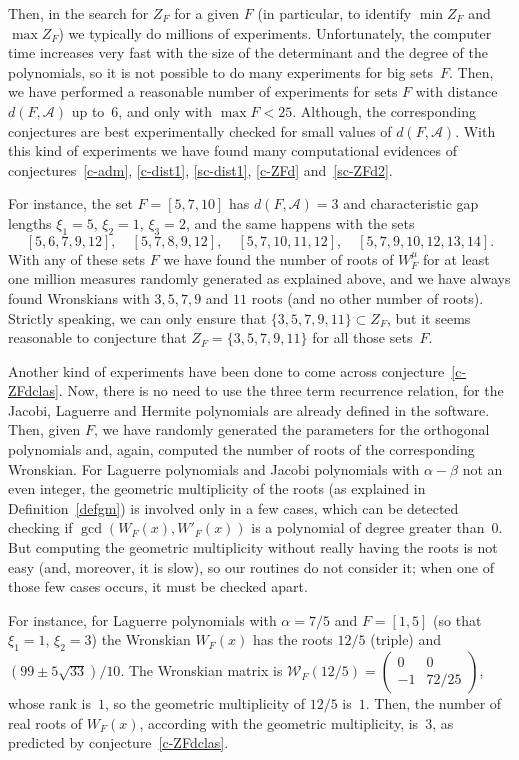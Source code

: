 \documentclass[10pt]{article}
\theoremstyle{plain}
\theoremstyle{definition}
\numberwithin{equation}{section} %
\newcommand\Ad{\mathcal{A}}
\newcommand\W{\mathcal{W}}
\begin{document}
Then, in the search for $Z_F$ for a given $F$ (in particular, to identify $\min Z_F$ and $\max Z_F$) we typically do millions of experiments. Unfortunately, the computer time increases very fast with the size of the determinant and the degree of the polynomials, so it is not possible to do many experiments for big sets~$F$. Then, we have performed a reasonable number of experiments for sets $F$ with distance $d(F,\Ad)$ up to~$6$, and only with $\max F < 25$. Although, the corresponding conjectures are best experimentally checked for small values of $d(F,\Ad)$. With this kind of experiments we have found many computational evidences of conjectures~\ref{c-adm}, \ref{c-dist1}, \ref{sc-dist1}, \ref{c-ZFd} and~\ref{sc-ZFd2}.

For instance, the set $F = [5,7,10]$ has $d(F,\Ad) = 3$ and characteristic gap lengths $\xi_1 = 5$, $\xi_2 = 1$, $\xi_3 = 2$, and the same happens with the sets
\[
[5,6,7,9,12], \quad
[5,7,8,9,12], \quad
[5,7,10,11,12], \quad
[5,7,9,10,12,13,14].
\]
With any of these sets $F$ we have found the number of roots of $W_F^\mu$ for at least one million measures randomly generated as explained above, and we have always found Wronskians with $3, 5, 7, 9$ and $11$ roots (and no other number of roots). Strictly speaking, we can only ensure that $\{3, 5, 7, 9, 11\} \subset Z_F$, but it seems reasonable to conjecture that $Z_F = \{3, 5, 7, 9, 11\}$ for all those sets~$F$.

Another kind of experiments have been done to come across conjecture~\ref{c-ZFdclas}. Now, there is no need to use the three term recurrence relation, for the Jacobi, Laguerre and Hermite polynomials are already defined in the software. Then, given $F$, we have randomly generated the parameters for the orthogonal polynomials and, again, computed the number of roots of the corresponding Wronskian. For Laguerre polynomials and Jacobi polynomials with $\alpha - \beta$ not an even integer, the geometric multiplicity of the roots (as explained in Definition~\ref{defgm}) is involved only in a few cases, which can be detected checking if $\gcd(W_F(x),W'_F(x))$ is a polynomial of degree greater than~$0$.
But computing the geometric multiplicity without really having the roots is not easy (and, moreover, it is slow), so our routines do not consider it; when one of those few cases occurs, it must be checked apart.

For instance, for Laguerre polynomials with $\alpha=7/5$ and $F=[1,5]$ (so that $\xi_1=1$, $\xi_2=3$) the Wronskian $W_F(x)$
has the roots $12/5$ (triple) and $(99 \pm 5\sqrt{33})/{10}$. The Wronskian matrix is $\W_F(12/5) = \left(\begin{smallmatrix}0 & 0 \\ -1 & 72/25\end{smallmatrix}\right)$, whose rank is~$1$, so the geometric multiplicity of $12/5$ is~$1$. Then, the number of real roots of $W_F(x)$, according with the geometric multiplicity, is~$3$, as predicted by conjecture~\ref{c-ZFdclas}.
\end{document}

